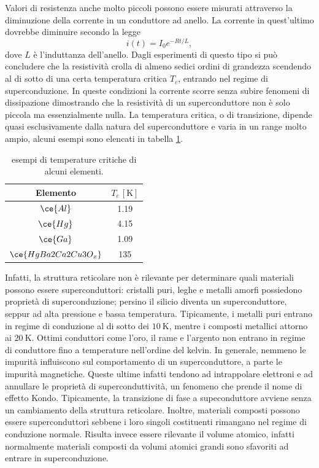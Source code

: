 Valori di resistenza anche molto piccoli possono essere misurati attraverso la diminuzione della corrente in un conduttore ad anello. La corrente in quest'ultimo dovrebbe diminuire secondo la legge 
\begin{equation}
    i(t) = I_0e^{-Rt/L},
\end{equation}
dove $L$ è l'induttanza dell'anello. Dagli esperimenti di questo tipo si può concludere che la resistività crolla di almeno sedici ordini di grandezza scendendo al di sotto di una certa temperatura critica $T_c$, entrando nel regime di superconduzione. In queste condizioni la corrente scorre senza subire fenomeni di dissipazione dimostrando che la resistività di un superconduttore non è solo piccola ma essenzialmente nulla. La temperatura critica, o di transizione, dipende quasi esclusivamente dalla natura del superconduttore e varia in un range molto ampio, alcuni esempi sono elencati in tabella \ref{tab: esempi di temperature critiche}.
\begin{table}[h]
    \centering
    \begin{tabular}{|c|c|}
        \hline
         Elemento & $T_c\,[\mathrm{K}]$ \\ \hline
         $\ce{Al}$ & 1.19 \\
         $\ce{Hg}$ & 4.15 \\ 
         $\ce{Ga}$ & 1.09 \\ 
         $\ce{HgBa2Ca2Cu3O_x}$ & 135 \\ \hline
    \end{tabular}
    \caption{esempi di temperature critiche di alcuni elementi.}
    \label{tab: esempi di temperature critiche}
\end{table}
Infatti, la struttura reticolare non è rilevante per determinare quali materiali possono essere superconduttori: cristalli puri, leghe e metalli amorfi possiedono proprietà di superconduzione; persino il silicio diventa un superconduttore, seppur ad alta pressione e bassa temperatura. Tipicamente, i metalli puri entrano in regime di conduzione al di sotto dei $\SI{10}{\kelvin}$, mentre i composti metallici attorno ai $\SI{20}{\kelvin}$. Ottimi conduttori come l'oro, il rame e l'argento non entrano in regime di conduttore fino a temperature nell'ordine del kelvin. In generale, nemmeno le impurità influiscono sul comportamento di un superconduttore, a parte le impurità magnetiche. Queste ultime infatti tendono ad intrappolare elettroni e ad annullare le proprietà di superconduttività, un fenomeno che prende il nome di effetto Kondo. Tipicamente, la transizione di fase a supeconduttore avviene senza un cambiamento della struttura reticolare. Inoltre, materiali composti possono essere superconduttori sebbene i loro singoli costituenti rimangano nel regime di conduzione normale. Risulta invece essere rilevante il volume atomico, infatti normalmente materiali composti da volumi atomici grandi sono sfavoriti ad entrare in superconduzione. 

